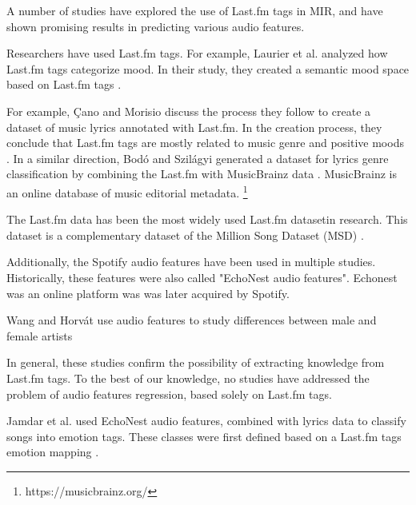 \documentclass[sn-mathphys]{sn-jnl}%
\theoremstyle{thmstyleone}%
\theoremstyle{thmstyletwo}%
\theoremstyle{thmstylethree}%
\begin{document}
A number of studies have explored the use of Last.fm tags in MIR,
and have shown promising results in predicting various audio features.

Researchers have used Last.fm tags.
For example, Laurier et al. analyzed how Last.fm tags categorize mood.
In their study, they created a semantic mood space based on Last.fm tags \cite{laurier2009music}.

For example, {\c{C}}ano and Morisio discuss the process they follow to create a dataset of music
lyrics annotated with Last.fm.
In the creation process, they conclude that Last.fm tags are mostly related to music genre
and positive moods \cite{ccano2017music}.
In a similar direction, Bod{\'o} and Szil{\'a}gyi generated a dataset for lyrics genre classification
by combining the Last.fm with MusicBrainz data \cite{bodo2018connecting}.
MusicBrainz \footnotemark[1] is an online database of music editorial metadata.
\footnote[1]{https://musicbrainz.org/}

The Last.fm data has been the most widely used Last.fm dataset\footnotemark[2] in research.
This dataset is a complementary dataset of the Million Song Dataset (MSD) \cite{Bertin-Mahieux2011}.



Additionally, the Spotify audio features have been used in multiple studies.
Historically, these features were also called "EchoNest audio features".
Echonest was an online platform was was later acquired by Spotify.

Wang and Horv{\'a}t use audio features to study differences between male and female artists \cite{wang2019gender}


In general, these studies confirm the possibility of extracting knowledge from Last.fm tags.
To the best of our knowledge, no studies have addressed the problem of audio features regression, based solely on Last.fm tags.

Jamdar et al. used EchoNest audio features, combined with lyrics data to classify songs into emotion tags.
These classes were first defined based on a Last.fm tags emotion mapping \cite{jamdar2015emotion}.
\end{document}
